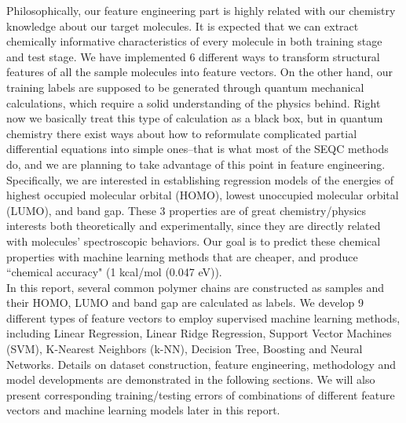 Philosophically, our feature engineering part is highly related with our chemistry knowledge about our target molecules. It is expected that we can extract chemically informative characteristics of every molecule in both training stage and test stage. We have implemented 6 different ways to transform structural features of all the sample molecules into feature vectors. On the other hand, our training labels are supposed to be generated through quantum mechanical calculations, which require a solid understanding of the physics behind. Right now we basically treat this type of calculation as a black box, but in quantum chemistry there exist ways about how to reformulate complicated partial differential equations into simple ones--that is what most of the SEQC methods do, and we are planning to take advantage of this point in feature engineering. Specifically, we are interested in establishing regression models of the energies of highest occupied molecular orbital (HOMO), lowest unoccupied molecular orbital (LUMO), and band gap. These 3 properties are of great chemistry/physics interests both theoretically and experimentally, since they are directly related with molecules' spectroscopic behaviors. Our goal is to predict these chemical properties with machine learning methods that are cheaper, and produce ``chemical accuracy" (1 kcal/mol (0.047 eV)).\\

In this report, several common polymer chains are constructed as samples and their HOMO, LUMO and band gap are calculated as labels. We develop 9 different types of feature vectors to employ supervised machine learning methods, including Linear Regression, Linear Ridge Regression, Support Vector Machines (SVM), K-Nearest Neighbors (k-NN), Decision Tree, Boosting and Neural Networks. Details on dataset construction, feature engineering, methodology and model developments are demonstrated in the following sections. We will also present corresponding training/testing errors of combinations of different feature vectors and machine learning models later in this report. \\

